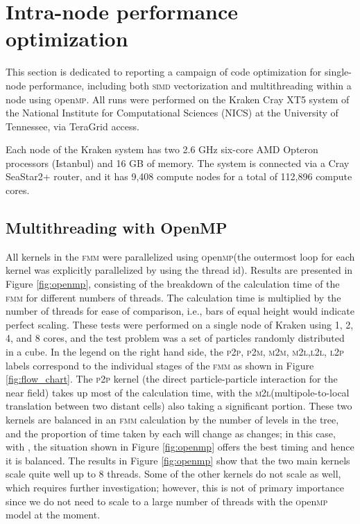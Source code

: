 \documentclass[10pt,twocolumn]{article}
\newcommand{\fmm}{\textsc{fmm}\xspace}
\newcommand{\simd}{\textsc{simd}\xspace}
\newcommand{\openmp}{\textsc{o}pen\textsc{mp}\xspace}
\newcommand{\MM}{\textsc{m}2\textsc{m}\xspace}
\newcommand{\PM}{\textsc{p}2\textsc{m}\xspace}
\newcommand{\ML}{\textsc{m}2\textsc{l}\xspace}
\newcommand{\LL}{\textsc{l}2\textsc{l}\xspace}
\newcommand{\LP}{\textsc{l}2\textsc{p}\xspace}
\newcommand{\PP}{\textsc{p}2\textsc{p}\xspace}
\newlength{\up}
\begin{document}
\section{Intra-node performance optimization}  
 

This section is dedicated to reporting a campaign of code optimization for single-node performance, including both \simd vectorization and multithreading within a node using \openmp. 
 All runs were performed on the Kraken Cray XT5 system of the National Institute for Computational Sciences (NICS) at the University of Tennessee, via TeraGrid access. 
 
 Each node of the Kraken system has two 2.6 GHz six-core AMD Opteron processors (Istanbul) and 16 GB of memory. The system is connected via a Cray SeaStar2+ router, and it has 9,408 compute nodes for a total of 112,896 compute cores.
 
 
\subsection{Multithreading with OpenMP}

All kernels in the \fmm were parallelized using \openmp (the outermost loop for each kernel was explicitly parallelized by using the thread id). Results are presented in Figure \ref{fig:openmp}, consisting of the breakdown of the calculation time of the \fmm for different numbers of threads. The calculation time is multiplied by the number of threads for ease of comparison, i.e., bars of equal height would indicate perfect scaling. These tests were performed on a single node of Kraken using 1, 2, 4, and 8 cores, and the test problem was a set of  particles randomly distributed in a cube.  In the legend on the right hand side, the \PP, \PM, \MM, \ML,\LL, \LP labels correspond to the individual stages of the \fmm as shown in Figure  \ref{fig:flow_chart}. The \PP kernel (the direct particle-particle interaction for the near field) takes up most of the calculation time, with the \ML (multipole-to-local translation between two distant cells) also taking a significant portion. These two kernels are balanced in an \fmm calculation by the number of levels in the tree, and the proportion of time taken by each will change as  changes; in this case, with , the situation shown in Figure  \ref{fig:openmp} offers the best timing and hence it is balanced.  The results in  Figure \ref{fig:openmp} show that the two main kernels scale quite well up to 8 threads. Some of the other kernels do not scale as well, which requires further investigation; however, this is not of primary importance since we do not need to scale to a large number of threads with the \openmp model at the moment.
\end{document}
